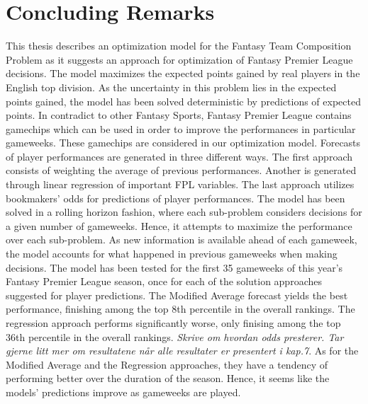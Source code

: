 
\chapter{Concluding Remarks}

This thesis describes an optimization model for the Fantasy Team Composition Problem as it suggests an approach for optimization of Fantasy Premier League decisions. The model maximizes the expected points gained by real players in the English top division. As the uncertainty in this problem lies in the expected points gained, the model has been solved deterministic by predictions of expected points. In contradict to other Fantasy Sports, Fantasy Premier League contains gamechips which can be used in order to improve the performances in particular gameweeks. These gamechips are considered in our optimization model. Forecasts of player performances are generated in three different ways. The first approach consists of weighting the average of previous performances. Another is generated through linear regression of important FPL variables. The last approach utilizes bookmakers' odds for predictions of player performances. 
\newpar
The model has been solved in a rolling horizon fashion, where each sub-problem considers decisions for a given number of gameweeks. Hence, it attempts to maximize the performance over each sub-problem. As new information is available ahead of each gameweek, the model accounts for what happened in previous gameweeks when making decisions. 
\newpar
The model has been tested for the first 35 gameweeks of this year's Fantasy Premier League season, once for each of the solution approaches suggested for player predictions. The Modified Average forecast yields the best performance, finishing among the top 8th percentile in the overall rankings. The regression approach performs significantly worse, only finising among the top 36th percentile in the overall rankings. \textit{Skrive om hvordan odds presterer. Tar gjerne litt mer om resultatene når alle resultater er presentert i kap.7}. As for the Modified Average and the Regression approaches, they have a tendency of performing better over the duration of the season. Hence, it seems like the models' predictions improve as gameweeks are played. 


